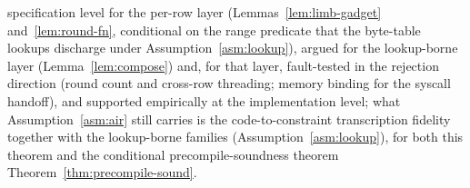 specification level for the per-row layer (Lemmas~\ref{lem:limb-gadget} and~\ref{lem:round-fn}, conditional on the range predicate that the byte-table lookups discharge under Assumption~\ref{asm:lookup}), argued for the lookup-borne layer (Lemma~\ref{lem:compose}) and, for that layer, fault-tested in the rejection direction (round count and cross-row threading; memory binding for the syscall handoff), and supported empirically at the implementation level; what Assumption~\ref{asm:air} still carries is the code-to-constraint transcription fidelity together with the lookup-borne families (Assumption~\ref{asm:lookup}), for both this theorem and the conditional precompile-soundness theorem Theorem~\ref{thm:precompile-sound}.
